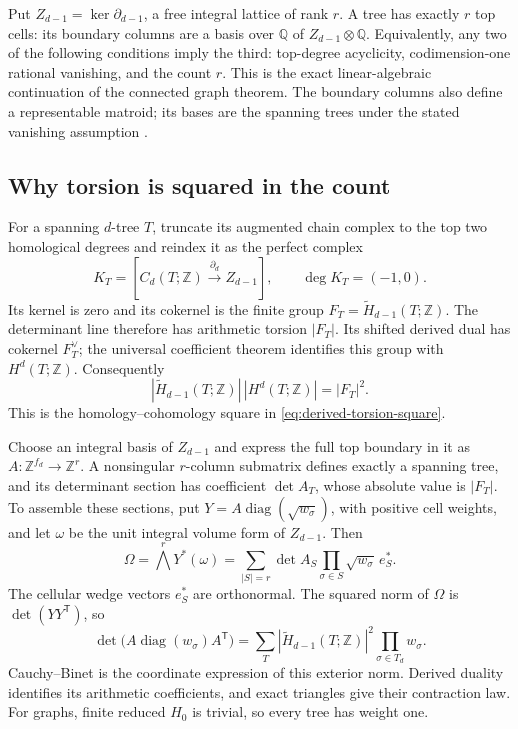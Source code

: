 \documentclass[11pt]{article}
\theoremstyle{definition}
\theoremstyle{remark}
\newcommand{\Q}{\mathbb Q}
\newcommand{\Z}{\mathbb Z}
\begin{document}
Put \(Z_{d-1}=\ker\partial_{d-1}\), a free integral lattice of rank
\(r\).  A tree has exactly \(r\) top cells: its boundary columns are a
basis over \(\Q\) of \(Z_{d-1}\otimes\Q\).  Equivalently, any two of
the following conditions imply the third: top-degree acyclicity,
codimension-one rational vanishing, and the count \(r\).  This is the
exact linear-algebraic continuation of the connected graph theorem.
The boundary columns also define a representable matroid; its bases are
the spanning trees under the stated vanishing assumption
\cite{gih-dkm-trees}.

\subsection{Why torsion is squared in the count}

For a spanning \(d\)-tree \(T\), truncate its augmented chain complex
to the top two homological degrees and reindex it as the perfect complex
\[
 K_T=[C_d(T;\Z)\xrightarrow{\partial_d}Z_{d-1}],
 \qquad \deg K_T=(-1,0).
\]
Its kernel is zero and its cokernel is the finite group
\(F_T=\widetilde H_{d-1}(T;\Z)\). The determinant line therefore has
arithmetic torsion \(|F_T|\). Its shifted derived dual has cokernel
\(F_T^\vee\); the universal coefficient theorem identifies this group
with \(H^d(T;\Z)\). Consequently
\[
 |\widetilde H_{d-1}(T;\Z)|\,|H^d(T;\Z)|=|F_T|^2.
\]
This is the homology--cohomology square in
\eqref{eq:derived-torsion-square}.

Choose an integral basis of \(Z_{d-1}\) and express the full top
boundary in it as \(A:\Z^{f_d}\to\Z^r\). A nonsingular \(r\)-column
submatrix defines exactly a spanning tree, and its determinant section
has coefficient \(\det A_T\), whose absolute value is \(|F_T|\).
To assemble these sections, put
\(Y=A\operatorname{diag}(\sqrt{w_\sigma})\), with positive cell
weights, and let \(\omega\) be the unit integral volume form of
\(Z_{d-1}\). Then
\[
 \Omega=\bigwedge^rY^*(\omega)
   =\sum_{|S|=r}\det A_S
                \prod_{\sigma\in S}\sqrt{w_\sigma}\,e_S^*.
\]
The cellular wedge vectors \(e_S^*\) are orthonormal. The squared norm of
\(\Omega\) is \(\det(YY^{\mathsf T})\), so
\begin{equation}\label{eq:gih-higher-cb}
 \det\bigl(A\operatorname{diag}(w_\sigma)A^{\mathsf T}\bigr)
   =\sum_T |\widetilde H_{d-1}(T;\Z)|^2
                   \prod_{\sigma\in T_d}w_\sigma.
\end{equation}
Cauchy--Binet is the coordinate expression of this exterior norm.
Derived duality identifies its arithmetic coefficients, and exact
triangles give their contraction law. For graphs, finite reduced
\(H_0\) is trivial, so every tree has weight one.
\end{document}
